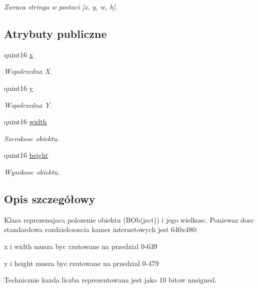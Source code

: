 \begin{DoxyCompactItemize}
\begin{DoxyCompactList}\small\item\em Zwraca stringa w postaci \mbox{[}x, y, w, h\mbox{]}. \item\end{DoxyCompactList}\end{DoxyCompactItemize}
\subsection*{Atrybuty publiczne}
\begin{DoxyCompactItemize}
\item 
quint16 \hyperlink{class_b_ob_a5dcc6a3c2f4ffaf3d630187e853dd876}{x}
\begin{DoxyCompactList}\small\item\em Wspolrzedna X. \item\end{DoxyCompactList}\item 
quint16 \hyperlink{class_b_ob_ada96bf49e446d3f9a5ce02f36e44c9b4}{y}
\begin{DoxyCompactList}\small\item\em Wspolrzedna Y. \item\end{DoxyCompactList}\item 
quint16 \hyperlink{class_b_ob_a3e1652784396111952cd16a77a666a2b}{width}
\begin{DoxyCompactList}\small\item\em Szerokosc obiektu. \item\end{DoxyCompactList}\item 
quint16 \hyperlink{class_b_ob_ac406681bc6029dc6e41aa53791e9f210}{height}
\begin{DoxyCompactList}\small\item\em Wysokosc obiektu. \item\end{DoxyCompactList}\end{DoxyCompactItemize}


\subsection{Opis szczegółowy}
Klasa reprezenujaca polozenie obiektu (BOb(ject)) i jego wielkosc. Poniewaz dosc standardowa rozdzielczoscia kamer internetowych jest 640x480:

\begin{DoxyItemize}
\item x i width musza byc rzutowane na przedzial 0-\/639 \item y i height musza byc rzutowane na przedzial 0-\/479\end{DoxyItemize}
Technicznie kazda liczba reprezentowana jest jako 10 bitow unsigned. 

